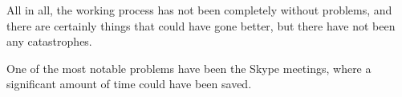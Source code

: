 All in all, the working process has not been completely without problems, and there are certainly things that could have gone better, but there have not been any catastrophes.

One of the most notable problems have been the Skype meetings, where a significant amount of time could have been saved.
